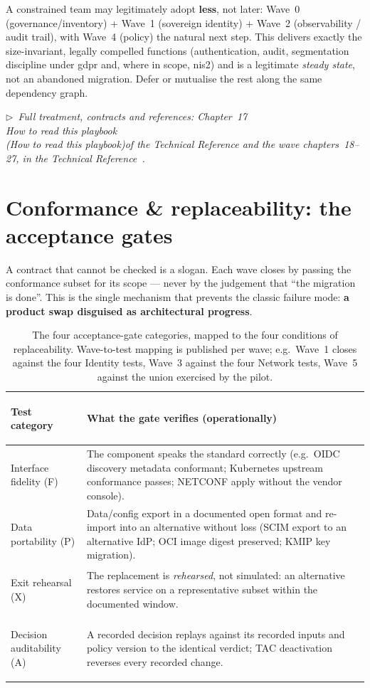\documentclass[11pt,a4paper]{article}
\newcommand{\keyword}[1]{\textbf{#1}}
\newcommand{\trchap}[2]{%
  Chapter~#1%
  \ifx\\#2\\\else\space(\emph{#2})\fi\space of the Technical Reference}
\newcommand{\mainref}[1]{%
  \par\vspace{1pt}
  {\footnotesize\color{gray}\itshape
  $\triangleright$~Full treatment, contracts and references: #1,
  in the Technical Reference~\cite{ng-tech-ref-2026}.}\par\vspace{2pt}}
\begin{document}
\begin{principlebox}
A constrained team may legitimately adopt \keyword{less}, not later: Wave~0
(governance/inventory) + Wave~1 (sovereign identity) + Wave~2 (observability
/ audit trail), with Wave~4 (policy) the natural next step. This delivers
exactly the size-invariant, legally compelled functions (authentication,
audit, segmentation discipline under \gls{gdpr} and, where in scope,
\gls{nis2}) and is a legitimate \emph{steady state}, not an abandoned
migration. Defer or mutualise the rest along the same dependency graph.
\end{principlebox}

\mainref{\trchap{17}{How to read this playbook} and the wave
chapters~18--27}

\section{Conformance \& replaceability: the acceptance gates}

A contract that cannot be checked is a slogan. Each wave closes by passing
the conformance subset for its scope --- never by the judgement that ``the
migration is done''. This is the single mechanism that prevents the classic
failure mode: \keyword{a product swap disguised as architectural progress}.

\begin{table}[h!]
\centering\small
\begin{tabularx}{\textwidth}{
  >{\bfseries\raggedright\arraybackslash}p{3.0cm} X}
\toprule
\textbf{Test category} & \textbf{What the gate verifies (operationally)} \\
\midrule
Interface fidelity (F) &
  The component speaks the standard correctly (e.g.\ OIDC discovery metadata
  conformant; Kubernetes upstream conformance passes; NETCONF apply without
  the vendor console). \\
\addlinespace
Data portability (P) &
  Data/config export in a documented open format and re-import into an
  alternative without loss (SCIM export to an alternative IdP; OCI image
  digest preserved; KMIP key migration). \\
\addlinespace
Exit rehearsal (X) &
  The replacement is \emph{rehearsed}, not simulated: an alternative restores
  service on a representative subset within the documented window. \\
\addlinespace
Decision auditability (A) &
  A recorded decision replays against its recorded inputs and policy version
  to the identical verdict; TAC deactivation reverses every recorded change. \\
\bottomrule
\end{tabularx}
\caption{The four acceptance-gate categories, mapped to the four conditions
of replaceability. Wave-to-test mapping is published per wave; e.g.\ Wave~1
closes against the four Identity tests, Wave~3 against the four Network
tests, Wave~5 against the union exercised by the pilot.}
\end{table}
\end{document}
